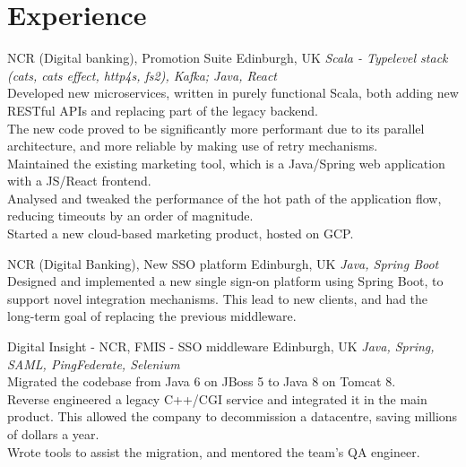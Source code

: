 \documentclass[nocolors]{curriculum-vitae}
\begin{document}
    \section{Experience}
        \vspace*{-0.3cm}
        \begin{entrylist}
             {NCR (Digital banking), Promotion Suite} {Edinburgh, UK}
            {\emph{Scala - Typelevel stack (cats, cats effect, http4s, fs2), Kafka; Java, React}
            \vspace*{0.05cm}\\
            Developed new microservices, written in purely functional Scala, both adding new RESTful APIs and replacing part of the legacy backend.\\
            The new code proved to be significantly more performant due to its parallel architecture, and more reliable by making use of retry mechanisms.\\
            Maintained the existing marketing tool, which is a Java/Spring web application with a JS/React frontend.\\
            Analysed and tweaked the performance of the hot path of the application flow, reducing timeouts by an order of magnitude.\\
            Started a new cloud-based marketing product, hosted on GCP.}
            \vspace*{0.3cm}
        
             {NCR (Digital Banking), New SSO platform} {Edinburgh, UK}
            {\emph{Java, Spring Boot}
            \vspace*{0.05cm}\\
            Designed and implemented a new single sign-on platform using Spring Boot, to support novel integration mechanisms. This lead to new clients, and had the long-term goal of replacing the previous middleware.}
            \vspace*{0.2cm}

             {Digital Insight - NCR, FMIS - SSO middleware} {Edinburgh, UK}
            {\emph{Java, Spring, SAML, PingFederate, Selenium}
            \vspace*{0.05cm}\\
            Migrated the codebase from Java 6 on JBoss 5 to Java 8 on Tomcat 8.\\
            Reverse engineered a legacy C++/CGI service and integrated it in the main product. This allowed the company to decommission a datacentre, saving millions of dollars a year.\\
            Wrote tools to assist the migration, and mentored the team's QA engineer.}
        \end{entrylist}
\end{document}
